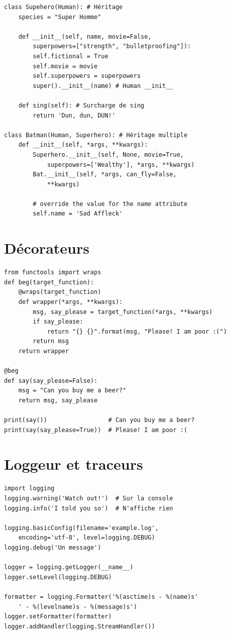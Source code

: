 \documentclass{article}
\begin{document}
\begin{multicols*}{4}
\begin{lstlisting}
class Supehero(Human): # Héritage
    species = "Super Homme"

    def __init__(self, name, movie=False,
        superpowers=["strength", "bulletproofing"]):
        self.fictional = True 
        self.movie = movie
        self.superpowers = superpowers
        super().__init__(name) # Human __init__ 

    def sing(self): # Surcharge de sing
        return 'Dun, dun, DUN!'

class Batman(Human, Superhero): # Héritage multiple
    def __init__(self, *args, **kwargs):
        Superhero.__init__(self, None, movie=True,
            superpowers=['Wealthy'], *args, **kwargs)
        Bat.__init__(self, *args, can_fly=False, 
            **kwargs)

        # override the value for the name attribute
        self.name = 'Sad Affleck'
\end{lstlisting}

\section*{Décorateurs}
\begin{lstlisting}
from functools import wraps
def beg(target_function):
    @wraps(target_function)
    def wrapper(*args, **kwargs):
        msg, say_please = target_function(*args, **kwargs)
        if say_please:
            return "{} {}".format(msg, "Please! I am poor :(")
        return msg
    return wrapper

@beg
def say(say_please=False):
    msg = "Can you buy me a beer?"
    return msg, say_please

print(say())                 # Can you buy me a beer?
print(say(say_please=True))  # Please! I am poor :(
\end{lstlisting}

\section*{Loggeur et traceurs}
\begin{lstlisting}
import logging
logging.warning('Watch out!')  # Sur la console
logging.info('I told you so')  # N'affiche rien 

logging.basicConfig(filename='example.log', 
    encoding='utf-8', level=logging.DEBUG)
logging.debug('Un message')

logger = logging.getLogger(__name__)
logger.setLevel(logging.DEBUG) 

formatter = logging.Formatter('%(asctime)s - %(name)s'
    ' - %(levelname)s - %(message)s')
logger.setFormatter(formatter)
logger.addHandler(logging.StreamHandler()) 


\end{lstlisting}
\end{multicols*}
\end{document}
